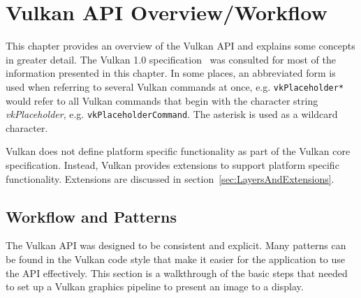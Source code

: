 
\chapter{Vulkan API Overview/Workflow}
\label{cha:VulkanOverview}

  This chapter provides an overview of the Vulkan API and explains some concepts in greater detail. The Vulkan 1.0 specification~\cite{vkspec} was consulted for most of the information presented in this chapter. In some places, an abbreviated form is used when referring to several Vulkan commands at once, e.g. \lstinline{vkPlaceholder*} would refer to all Vulkan commands that begin with the character string \textit{vkPlaceholder}, e.g. \lstinline{vkPlaceholderCommand}. The asterisk is used as a wildcard character.

  Vulkan does not define platform specific functionality as part of the Vulkan core specification. Instead, Vulkan provides extensions to support platform specific functionality. Extensions are discussed in section~\ref{sec:LayersAndExtensions}.


  \section{Workflow and Patterns}
  \label{sec:WorkflowAndPatterns}
    The Vulkan API was designed to be consistent and explicit. Many patterns can be found in the Vulkan code style that make it easier for the \gls{application} to use the API effectively. This section is a walkthrough of the basic steps that needed to set up a Vulkan graphics pipeline to present an image to a display.

